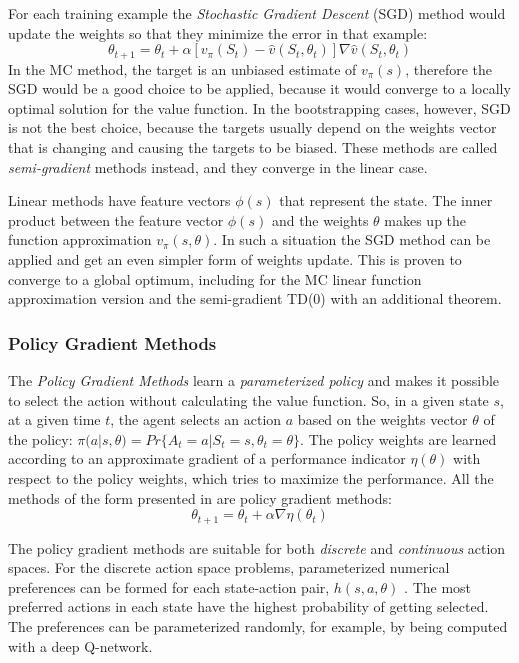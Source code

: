 For each training example the \textit{Stochastic Gradient Descent} (SGD) method would update the weights so that they minimize the error in that example:
\begin{equation}\label{SGD}
\theta_{t+1}=\theta_{t}+\alpha \left [ v_{\pi}(S_{t}) - \hat{v}(S_{t},\theta_{t}) \right ]\nabla\hat{v}(S_{t},\theta_{t})
\end{equation}
In the MC method, the target is an unbiased estimate of $v_{\pi}(s)$, therefore the SGD would be a good choice to be applied, because it would converge to a locally optimal solution for the value function. In the bootstrapping cases, however, SGD is not the best choice, because the targets usually depend on the weights vector that is changing and causing the targets to be biased. These methods are called \textit{semi-gradient} methods instead, and they converge in the linear case.

Linear methods have feature vectors $\phi(s)$ that represent the state. The inner product between the feature vector $\phi(s)$ and the weights $\theta$ makes up the function approximation $v_{\pi}(s,\theta)$. In such a situation the SGD method can be applied and get an even simpler form of weights update. This is proven to converge to a global optimum, including for the MC linear function approximation version and the semi-gradient TD(0) with an additional theorem.

\subsubsection{Policy Gradient Methods} \label{PolicyGradMeths}
The \textit{Policy Gradient Methods} learn a \textit{parameterized policy} and makes it possible to select the action without calculating the value function. So, in a given state $s$, at a given time $t$, the agent selects an action $a$ based on the weights vector ${\theta}$ of the policy: ${\pi}(a|s,{\theta})=Pr\{A_{t}=a|S_{t}=s,{\theta}_{t}={\theta}\}$. The policy weights are learned according to an approximate gradient of a performance indicator ${\eta}({\theta})$ with respect to the policy weights, which tries to maximize the performance. All the methods of the form presented in  are policy gradient methods:
\begin{equation}\label{gradM}
\theta_{t+1}=\theta_{t}+\alpha \nabla \eta (\theta_{t})
\end{equation}

The policy gradient methods are suitable for both \textit{discrete} and \textit{continuous} action spaces. For the discrete action space problems, parameterized numerical preferences can be formed for each state-action pair, $h(s,a,\theta)$ \cite{Sutton}. The most preferred actions in each state have the highest probability of getting selected. The preferences can be parameterized randomly, for example, by being computed with a deep Q-network. 

